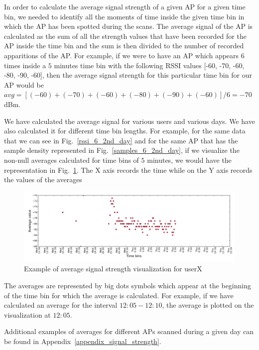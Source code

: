 In order to calculate the average signal strength of a given AP for a given time
bin, we needed to identify all the moments of time inside the given time bin in which
the AP has been spotted during the scans. The average signal of the AP is
calculated as the sum of all the strength values that have been recorded for the
AP inside the time bin and the sum is then divided to the number of recorded
apparitions of the AP. For example, if we were to have an AP which appears 6
times inside a $5$ minutes time bin with the following RSSI values [-60, -70,
-60, -80, -90, -60], then the average signal strength for this particular time
bin for our AP would be $avg = [(-60) + (-70) + (-60) + (-80) + (-90) +
(-60)] / 6= -70$ dBm.

We have calculated the average signal for various users and various days. We
have also calculated it for different time bin lengths. For example, for the
same data that we can see in Fig.~\ref{rssi_6_2nd_day} and for the same AP that has
the sample density represented in Fig.~\ref{samples_6_2nd_day}, if we visualize
the non-null averages calculated for time bins of $5$ minutes, we would have the
representation in Fig.~\ref{user_6_avg_1d_5m}. The X axis records the time
while on the Y axis records the values of the averages

\begin{figure}[h]
\centering
\includegraphics[width =\textwidth]{figures/combinations/user_6_sorted_1days_plot_14280_avg_sig.png}
\caption{Example of average signal strength visualization for userX}
\label{user_6_avg_1d_5m}
\end{figure}

The averages are represented by big dots symbols which appear at the beginning
of the time bin for which the average is calculated. For example, if we have
calculated an average for the interval $12:05 - 12:10$, the average is plotted
on the visualization at $12:05$. 

Additional examples of averages for different APs scanned during a given day can
be found in Appendix~\ref{appendix_signal_strength}.

